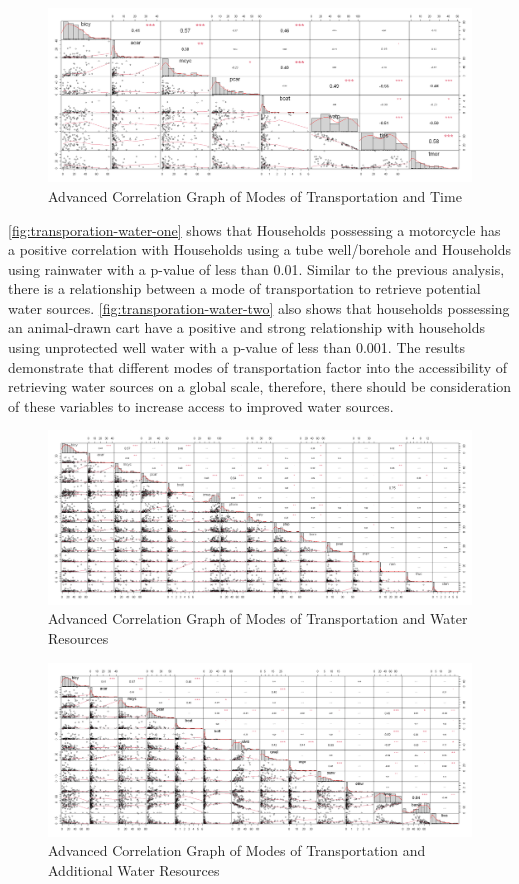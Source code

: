 \documentclass[10pt,twoside]{article}
\numberwithin{equation}{section}
\newcommand{\?}{\stackrel{?}{=}}
\begin{document}
\begin{figure}[h!]
  \centering
  \includegraphics[width=.7\textwidth]{transportation-time}
  \caption{Advanced Correlation Graph of Modes of Transportation and Time}
  \label{fig:transporation-time}
\end{figure}
\autoref{fig:transporation-water-one} shows that Households possessing a motorcycle has a positive correlation with Households using a tube well/borehole and Households using rainwater with a p-value of less than 0.01. Similar to the previous analysis, there is a relationship between a mode of transportation to retrieve potential water sources. \autoref{fig:transporation-water-two} also shows that households possessing an animal-drawn cart have a positive and strong relationship with households using unprotected well water with a p-value of less than 0.001. The results demonstrate that different modes of transportation factor into the accessibility of retrieving water sources on a global scale, therefore, there should be consideration of these variables to increase access to improved water sources. 
\begin{figure}[h!]
  \centering
  \includegraphics[width=.7\textwidth]{transportation-water-1}
  \caption{Advanced Correlation Graph of Modes of Transportation and Water Resources}
  \label{fig:transporation-water-one}
\end{figure}

\begin{figure}[h!]
  \centering
  \includegraphics[width=.7\textwidth]{transportation-water-2}
  \caption{Advanced Correlation Graph of Modes of Transportation and Additional Water Resources}
  \label{fig:transporation-water-two}
\end{figure}
\end{document}
